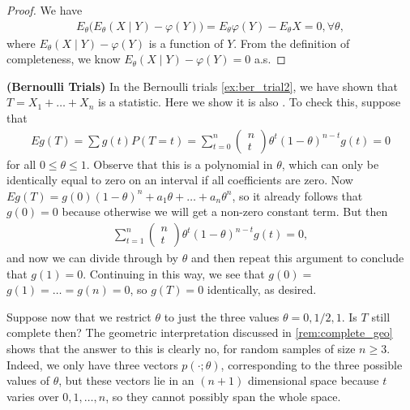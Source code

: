 \documentclass{article}
\newcommand{\bfs}[1]{\textbf{({#1}) }}
\begin{document}
\begin{proof}
We have 
\begin{align*}
    E_\theta \bigg(E_\theta(X\mid Y)-\varphi(Y)\bigg) = E_\theta \varphi(Y)-E_\theta X= 0, \forall \theta,
\end{align*}
where $E_\theta(X\mid Y)-\varphi(Y)$ is a function of $Y$. From the definition of completeness, we know $E_\theta(X\mid Y)-\varphi(Y) = 0$ a.s. 
\end{proof}
\begin{exma}\bfs{Bernoulli Trials}\label{ex:ber_trial3}
  In the Bernoulli trials \cref{ex:ber_trial2}, we have shown that   $T=X_{1}+\ldots+X_{n}$ is a   statistic. Here we show it is also . To check this, suppose that 
\begin{align*}
E g(T)=\sum g(t) P(T=t)=\sum_{t=0}^{n}\left(\begin{array}{l}
n \\
t
\end{array}\right) \theta^{t}(1-\theta)^{n-t} g(t)=0
\end{align*}
for all $0 \leq \theta \leq 1$. Observe that this is a polynomial in $\theta$, which can only be identically equal to zero on an interval if all coefficients are zero. Now $Eg(T)=g(0)(1-\theta)^{n}+a_{1} \theta+\ldots+a_{n} \theta^{n}$, so it already follows that $g(0)=0$ because otherwise we will get a non-zero constant term. But then
\begin{align*}
\sum_{t=1}^{n}\left(\begin{array}{l}
n \\
t
\end{array}\right) \theta^{t}(1-\theta)^{n-t} g(t)=0,
\end{align*}
and now we can divide through by $\theta$ and then repeat this argument to conclude that $g(1)=0$. Continuing in this way, we see that $g(0)=$ $g(1)=\ldots=g(n)=0$, so $g(T)=0$ identically, as desired.
\end{exma}
\begin{rema}
Suppose now that we restrict $\theta$ to just the three values $\theta=0,1 / 2,1$. Is $T$ still complete then? The geometric interpretation discussed in \cref{rem:complete_geo} shows that the answer to this is clearly no, for random samples of size $n \geq 3$. Indeed, we only have three vectors $p(\cdot ; \theta)$, corresponding to the three possible values of $\theta$, but these vectors lie in an $(n+1)$ dimensional space because $t$ varies over $0,1, \ldots, n$, so they cannot possibly span the whole space.
\end{rema}
\end{document}
